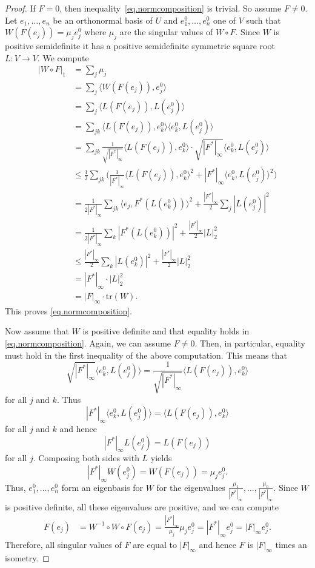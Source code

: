 \documentclass[11pt,reqno]{amsart}
\newcommand{\tr}{\mathrm{tr}}
\newcommand{\<}{\langle}
\renewcommand{\>}{\rangle}
\theoremstyle{definition}
\begin{document}
\begin{proof}
If $F=0$, then inequality~\eqref{eq.normcomposition} is trivial.
So assume $F\neq 0$.
Let $e_1,\dots,e_n$ be an orthonormal basis of $U$ and $e_1^0,\dots,e_n^0$ one of $V$ such that $W(F(e_j))=\mu_j e_j^0$ where $\mu_j$ are the singular values of $W\circ F$.
Since $W$ is positive semidefinite it has a positive semidefinite symmetric square root $L\colon V\to V$.
We compute
\begin{align*}
|W\circ F|_1 
&=
\sum_j \mu_j \\
&=
\sum_j \< W(F(e_j)), e_j^0\>\\
&=
\sum_j \< L(F(e_j)), L(e_j^0)\>\\
&=
\sum_{jk} \< L(F(e_j)),e_k^0\>\<e_k^0, L(e_j^0)\>\\
&=
\sum_{jk} \frac{1}{\sqrt{|F^*|_\infty}}\< L(F(e_j)),e_k^0\>\cdot\sqrt{|F^*|_\infty}\<e_k^0, L(e_j^0)\>\\
&\le
\tfrac12\sum_{jk}\Big( \frac{1}{|F^*|_\infty}\< L(F(e_j)),e_k^0\>^2 + |F^*|_\infty\<e_k^0, L(e_j^0)\>^2\Big)\\
&=
\frac{1}{2|F^*|_\infty}\sum_{jk}\< e_j,F^*(L(e_k^0))\>^2 + \frac{|F^*|_\infty}{2}\sum_j|L(e_j^0)|^2\\
&=
\frac{1}{2|F^*|_\infty}\sum_{k}|F^*(L(e_k^0))|^2 + \frac{|F^*|_\infty}{2}|L|_2^2\\
&\le
\frac{|F^*|_\infty}{2}\sum_{k}|L(e_k^0)|^2 + \frac{|F^*|_\infty}{2}|L|_2^2\\
&=
|F^*|_\infty\cdot |L|_2^2\\
&=
|F|_\infty\cdot \tr(W).
\end{align*}
This proves \eqref{eq.normcomposition}.

Now assume that $W$ is positive definite and that equality holds in \eqref{eq.normcomposition}.
Again, we can assume $F\neq 0$.
Then, in particular, equality must hold in the first inequality of the above computation.
This means that 
$$
\sqrt{|F^*|_\infty}\<e_k^0, L(e_j^0)\> = \frac{1}{\sqrt{|F^*|_\infty}}\< L(F(e_j)),e_k^0\>
$$
for all $j$ and $k$.
Thus 
$$
|F^*|_\infty\<e_k^0, L(e_j^0)\> = \< L(F(e_j)),e_k^0\>
$$
for all $j$ and $k$ and hence
$$
|F^*|_\infty L(e_j^0) = L(F(e_j))
$$
for all $j$.
Composing both sides with $L$ yields
$$
|F^*|_\infty W(e_j^0)=W(F(e_j)) = \mu_j e_j^0.
$$
Thus, $e_1^0,\dots,e_n^0$ form an eigenbasis for $W$ for the eigenvalues $\frac{\mu_1}{|F^*|_\infty},\dots,\frac{\mu_n}{|F^*|_\infty}$.
Since $W$ is positive definite, all these eigenvalues are positive, and we can compute
\begin{align*}
F(e_j) 
&= 
W^{-1}\circ W\circ F(e_j) 
= 
\frac{|F^*|_\infty}{\mu_j}\mu_j e_j^0
=
|F^*|_\infty e_j^0
=
|F|_\infty e_j^0 .
\end{align*}
Therefore, all singular values of $F$ are equal to $|F|_\infty$ and hence $F$ is $|F|_\infty$ times an isometry.
\end{proof}
\end{document}
